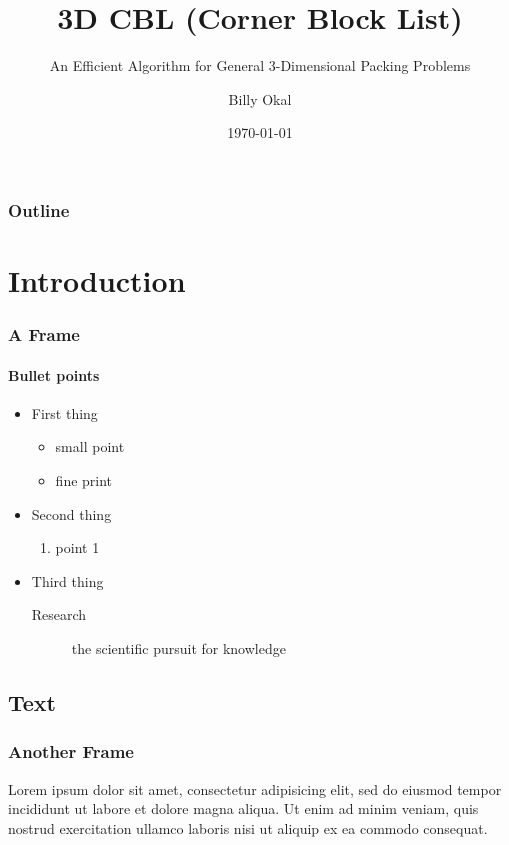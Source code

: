 \documentclass{beamer}
\title{3D CBL (Corner Block List)}
\subtitle{An Efficient Algorithm for General 3-Dimensional Packing Problems}
\author{Billy Okal}
\date{\today}
\institute{\url{b.okal@jacobs-university.de}\\\url{http://www.makokal.com}}
\begin{document}
\begin{frame}[plain,t]
\titlepage
\end{frame}

\begin{frame}%
	\frametitle{Outline}
\tableofcontents
\end{frame}


\section{Introduction}
\begin{frame}
\frametitle{A Frame}
\framesubtitle{Bullet points}
\begin{itemize}
\item First thing
	\begin{itemize}
	\item small point
	\item fine print
	\end{itemize}
\item Second thing
	\begin{enumerate}
	\item point 1
	\end{enumerate}
\item Third thing
	\begin{description}
	\item[Research] the scientific pursuit for knowledge
	\end{description}
\end{itemize}
\end{frame}

\subsection{Text}
\begin{frame}
\frametitle{Another Frame}
Lorem ipsum dolor sit amet, consectetur adipisicing elit, sed do eiusmod tempor incididunt ut labore et dolore magna aliqua. Ut enim ad minim veniam, quis nostrud exercitation ullamco laboris nisi ut aliquip ex ea commodo consequat.
\end{frame}
\end{document}
